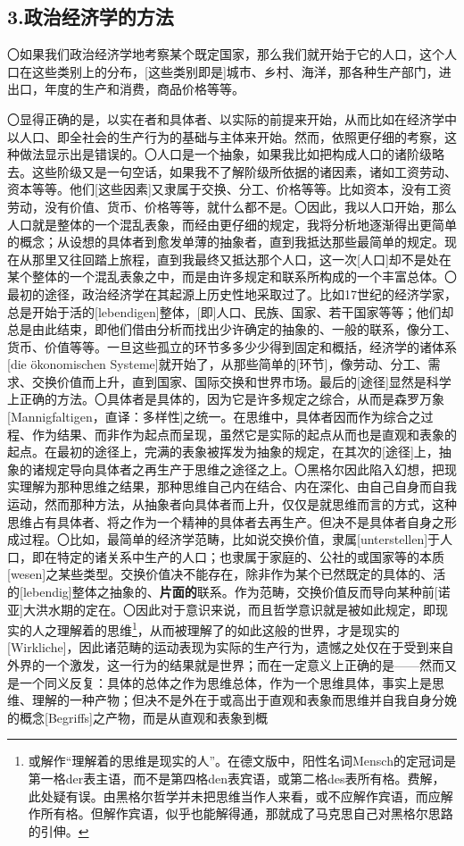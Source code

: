 \documentclass[a5paper,twoside,10.5pt]{ctexart}
\begin{document}
\newpage

\subsection{3.政治经济学的方法}

〇如果我们政治经济学地考察某个既定国家，那么我们就开始于它的人口，这个人口在这些类别上的分布，[这些类别即是]城市、乡村、海洋，那各种生产部门，进出口，年度的生产和消费，商品价格等等。

〇显得正确的是，以实在者和具体者、以实际的前提来开始，从而比如在经济学中以人口、即全社会的生产行为的基础与主体来开始。然而，依照更仔细的考察，这种做法显示出是错误的。〇人口是一个抽象，如果我比如把构成人口的诸阶级略去。这些阶级又是一句空话，如果我不了解阶级所依据的诸因素，诸如工资劳动、资本等等。他们[这些因素]又隶属于交换、分工、价格等等。比如资本，没有工资劳动，没有价值、货币、价格等等，就什么都不是。〇因此，我以人口开始，那么人口就是整体的一个混乱表象，而经由更仔细的规定，我将分析地逐渐得出更简单的概念；从设想的具体者到愈发单薄的抽象者，直到我抵达那些最简单的规定。现在从那里又往回踏上旅程，直到我最终又抵达那个人口，这一次[人口]却不是处在某个整体的一个混乱表象之中，而是由许多规定和联系所构成的一个丰富总体。〇最初的途径，政治经济学在其起源上历史性地采取过了。比如17世纪的经济学家，总是开始于活的[lebendigen]整体，[即]人口、民族、国家、若干国家等等；他们却总是由此结束，即他们借由分析而找出少许确定的抽象的、一般的联系，像分工、货币、价值等等。一旦这些孤立的环节多多少少得到固定和概括，经济学的诸体系[die ökonomischen Systeme]就开始了，从那些简单的[环节]，像劳动、分工、需求、交换价值而上升，直到国家、国际交换和世界市场。最后的[途径]显然是科学上正确的方法。〇具体者是具体的，因为它是许多规定之综合，从而是森罗万象[Mannigfaltigen，直译：多样性]之统一。在思维中，具体者因而作为综合之过程、作为结果、而非作为起点而呈现，虽然它是实际的起点从而也是直观和表象的起点。在最初的途径上，完满的表象被挥发为抽象的规定，在其次的[途径]上，抽象的诸规定导向具体者之再生产于思维之途径之上。〇黑格尔因此陷入幻想，把现实理解为那种思维之结果，那种思维自己内在结合、内在深化、由自己自身而自我运动，然而那种方法，从抽象者向具体者而上升，仅仅是就思维而言的方式，这种思维占有具体者、将之作为一个精神的具体者去再生产。但决不是具体者自身之形成过程。〇比如，最简单的经济学范畴，比如说交换价值，隶属[unterstellen]于人口，即在特定的诸关系中生产的人口；也隶属于家庭的、公社的或国家等的本质[wesen]之某些类型。交换价值决不能存在，除非作为某个已然既定的具体的、活的[lebendig]整体之抽象的、\textbf{片面的}联系。作为范畴，交换价值反而导向某种前[诺亚]大洪水期的定在。〇因此对于意识来说，而且哲学意识就是被如此规定，即现实的人之理解着的思维\footnote{或解作“理解着的思维是现实的人”。在德文版中，阳性名词Mensch的定冠词是第一格der表主语，而不是第四格den表宾语，或第二格des表所有格。费解，此处疑有误。由黑格尔哲学并未把思维当作人来看，或不应解作宾语，而应解作所有格。但解作宾语，似乎也能解得通，那就成了马克思自己对黑格尔思路的引伸。}，从而被理解了的如此这般的世界，才是现实的[Wirkliche]，因此诸范畴的运动表现为实际的生产行为，遗憾之处仅在于受到来自外界的一个激发，这一行为的结果就是世界；而在一定意义上正确的是——然而又是一个同义反复：具体的总体之作为思维总体，作为一个思维具体，事实上是思维、理解的一种产物；但决不是外在于或高出于直观和表象而思维并自我自身分娩的概念[Begriffs]之产物，而是从直观和表象到概
\end{document}
